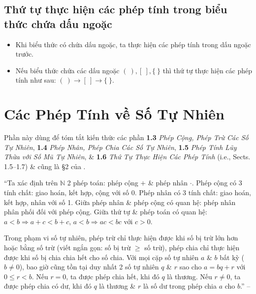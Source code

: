 \documentclass[oneside]{book}
\numberwithin{equation}{section}
\begin{document}
\subsection{Thứ tự thực hiện các phép tính trong biểu thức chứa dấu ngoặc}
\begin{tcolorbox}
	\begin{itemize}
		\item Khi biểu thức có chứa dấu ngoặc, ta thực hiện các phép tính trong dấu ngoặc trước.
		\item Nếu biểu thức chứa các dấu ngoặc $(\ ),[\ ],\{\ \}$ thì thứ tự thực hiện các phép tính như sau: $(\ )\to[\ ]\to\{\ \}$.
	\end{itemize}	
\end{tcolorbox}


\section*{Các Phép Tính về Số Tự Nhiên}
Phần này dùng để tóm tắt kiến thức các phần \textbf{1.3} \textit{Phép Cộng, Phép Trừ Các Số Tự Nhiên}, \textbf{1.4} \textit{Phép Nhân, Phép Chia Các Số Tự Nhiên}, \textbf{1.5} \textit{Phép Tính Lũy Thừa với Số Mũ Tự Nhiên}, \& \textbf{1.6} \textit{Thứ Tự Thực Hiện Các Phép Tính} (i.e., Sects. 1.5--1.7) \& cũng là \S2 của \cite{Binh_Toan_6_tap_1}.

``Ta xác định trên $\mathbb{N}$ 2 phép toán: phép cộng $+$ \& phép nhân $\cdot$. Phép cộng có 3 tính chất: giao hoán, kết hợp, cộng với số 0. Phép nhân có 3 tính chất: giao hoán, kết hợp, nhân với số 1. Giữa phép nhân \& phép cộng có quan hệ: phép nhân phân phối đối với phép cộng. Giữa thứ tự \& phép toán có quan hệ: $a < b\Rightarrow a + c < b + c$, $a < b\Rightarrow ac < bc$ với $c > 0$.

Trong phạm vi số tự nhiên, phép trừ chỉ thực hiện được khi số bị trừ lớn hơn hoặc bằng số trừ (viết ngắn gọn: số bị  trừ $\ge$ số trừ), phép chia chỉ thực hiện được khi số bị chia chia hết cho số chia. Với mọi cặp số tự nhiên $a$ \& $b$ bất kỳ ($b\ne 0$), bao giờ cũng tồn tại duy nhất 2 số tự nhiên $q$ \& $r$ sao cho $a = bq + r$ với $0\le r < b$. Nếu $r = 0$, ta được phép chia hết, khi đó $q$ là thương. Nếu $r\ne 0$, ta được phép chia có dư, khi đó $q$ là thương \& $r$ là số dư trong phép chia $a$ cho $b$.'' -- \cite[p. 9]{Binh_Toan_6_tap_1}
\end{document}
